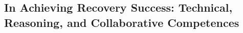 






\subsection{In Achieving Recovery Success: Technical, Reasoning, and Collaborative Competences}
\label{Section: Multifaceted Abilities for Effective Recoveries}


